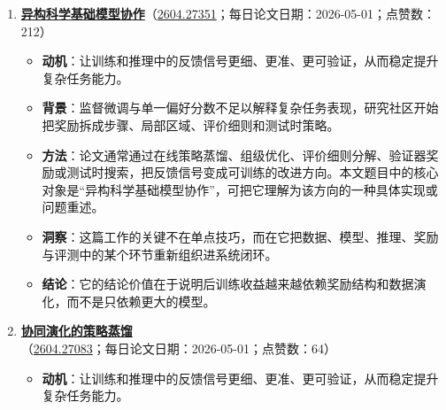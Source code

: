 \begin{enumerate}[leftmargin=1.5em]
  \begin{itemize}[leftmargin=1.5em]
    \item \textbf{动机}：让训练和推理中的反馈信号更细、更准、更可验证，从而稳定提升复杂任务能力。
    \item \textbf{背景}：监督微调与单一偏好分数不足以解释复杂任务表现，研究社区开始把奖励拆成步骤、局部区域、评价细则和测试时策略。
    \item \textbf{方法}：论文通常通过在线策略蒸馏、组级优化、评价细则分解、验证器奖励或测试时搜索，把反馈信号变成可训练的改进方向。本文题目中的核心对象是“Odysseus：通过强化学习把视觉语言模型扩展到百轮以上游戏决策”，可把它理解为该方向的一种具体实现或问题重述。
    \item \textbf{洞察}：奖励信号越能贴近任务结构，后训练越可能稳定地产生能力增益。
    \item \textbf{结论}：它的结论价值在于说明后训练收益越来越依赖奖励结构和数据演化，而不是只依赖更大的模型。
  \end{itemize}
  \item \textbf{\href{https://huggingface.co/papers/2604.27351}{异构科学基础模型协作}}（\href{https://arxiv.org/abs/2604.27351}{2604.27351}；每日论文日期：2026-05-01；点赞数：212）
  \begin{itemize}[leftmargin=1.5em]
    \item \textbf{动机}：让训练和推理中的反馈信号更细、更准、更可验证，从而稳定提升复杂任务能力。
    \item \textbf{背景}：监督微调与单一偏好分数不足以解释复杂任务表现，研究社区开始把奖励拆成步骤、局部区域、评价细则和测试时策略。
    \item \textbf{方法}：论文通常通过在线策略蒸馏、组级优化、评价细则分解、验证器奖励或测试时搜索，把反馈信号变成可训练的改进方向。本文题目中的核心对象是“异构科学基础模型协作”，可把它理解为该方向的一种具体实现或问题重述。
    \item \textbf{洞察}：这篇工作的关键不在单点技巧，而在它把数据、模型、推理、奖励与评测中的某个环节重新组织进系统闭环。
    \item \textbf{结论}：它的结论价值在于说明后训练收益越来越依赖奖励结构和数据演化，而不是只依赖更大的模型。
  \end{itemize}
  \item \textbf{\href{https://huggingface.co/papers/2604.27083}{协同演化的策略蒸馏}}（\href{https://arxiv.org/abs/2604.27083}{2604.27083}；每日论文日期：2026-05-01；点赞数：64）
  \begin{itemize}[leftmargin=1.5em]
    \item \textbf{动机}：让训练和推理中的反馈信号更细、更准、更可验证，从而稳定提升复杂任务能力。

\end{itemize}
\end{enumerate}
